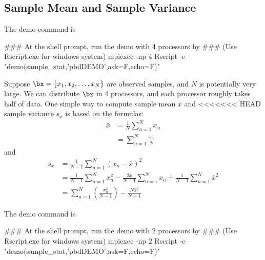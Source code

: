 \subsection[Sample Mean and Sample Variance]{Sample Mean and Sample Variance}
\label{sec:sample_stat}

The demo command is
\begin{Command}
### At the shell prompt, run the demo with 4 processors by
### (Use Rscript.exe for windows system)
mpiexec -np 4 Rscript -e "demo(sample_stat,'pbdDEMO',ask=F,echo=F)"
\end{Command}

Suppose $\bx = \{x_1, x_2, \ldots, x_N\}$
are observed samples, and $N$ is potentially very large.
We can distribute $\bx$ in 4 processors, and each processor roughly
takes half of data. One simple way to compute sample mean $\bar{x}$ and
<<<<<<< HEAD
sample variance $s_x$ is based on the formulas:
\begin{align*}
\bar{x} &= \frac{1}{N} \sum_{n = 1}^N x_n \\[.3cm]
        &= \sum_{n = 1}^N \frac{x_n}{N}
\end{align*}
and
\begin{align*}
s_x     &= \frac{1}{N - 1} \sum_{n = 1}^N (x_n - \bar{x})^2 \\[.3cm]
        &= \frac{1}{N - 1} \sum_{n = 1}^N x_n^2 - \frac{2\bar{x}}{N - 1}\sum_{n = 1}^N x_n +  \frac{1}{N - 1}\sum_{n = 1}^N\bar{x}^2 \\[.3cm]
        &= \sum_{n = 1}^N \left(\frac{x^2_n}{N-1}\right) - \frac{N \bar{x}^2}{N-1}
\end{align*}


The demo command is
\begin{Command}
### At the shell prompt, run the demo with 2 processors by
### (Use Rscript.exe for windows system)
mpiexec -np 2 Rscript -e "demo(sample_stat,'pbdDEMO',ask=F,echo=F)"
\end{Command}

